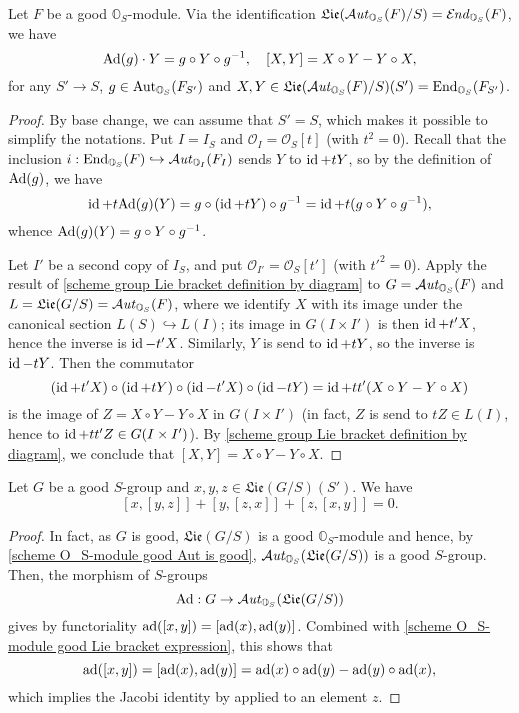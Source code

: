 \begin{proposition}\label{scheme O_S-module good Lie bracket expression}
Let $F$ be a good $\mathbb{O}_S$-module. Via the identification $\mathfrak{Lie}(\operatorname{\mathcal{A}\hspace*{-0.2pt}\textit{ut}\hspace{0.5pt}}_{\mathbb{O}_S}(F)/S)=\operatorname{\mathcal{E}\hspace*{-1pt}\textit{nd}\hspace{0.5pt}}_{\mathbb{O}_S}(F)$, we have
\[\mathrm{Ad}(g)\cdot Y=g\circ Y\circ g^{-1},\quad [X,Y]=X\circ Y-Y\circ X,\]
for any $S'\to S$, $g\in\mathrm{Aut}_{\mathbb{O}_S}(F_{S'})$ and $X,Y\in\mathfrak{Lie}(\operatorname{\mathcal{A}\hspace*{-0.2pt}\textit{ut}\hspace{0.5pt}}_{\mathbb{O}_S}(F)/S)(S')=\mathrm{End}_{\mathbb{O}_S}(F_{S'})$.
\end{proposition}
\begin{proof}
By base change, we can assume that $S'=S$, which makes it possible to simplify the notations. Put $I=I_S$ and $\mathscr{O}_I=\mathscr{O}_S[t]$ (with $t^2=0$). Recall that the inclusion $i:\mathrm{End}_{\mathbb{O}_S}(F)\hookrightarrow\operatorname{\mathcal{A}\hspace*{-0.2pt}\textit{ut}\hspace{0.5pt}}_{\mathbb{O}_I}(F_I)$ sends $Y$ to $\operatorname{id}+tY$, so by the definition of $\mathrm{Ad}(g)$, we have
\[\operatorname{id}+t\mathrm{Ad}(g)(Y)=g\circ(\operatorname{id}+tY)\circ g^{-1}=\operatorname{id}+t(g\circ Y\circ g^{-1}),\]
whence $\mathrm{Ad}(g)(Y)=g\circ Y\circ g^{-1}$.\par
Let $I'$ be a second copy of $I_S$, and put $\mathscr{O}_{I'}=\mathscr{O}_S[t']$ (with $t'^2=0$). Apply the result of \cref{scheme group Lie bracket definition by diagram} to $G=\operatorname{\mathcal{A}\hspace*{-0.2pt}\textit{ut}\hspace{0.5pt}}_{\mathbb{O}_S}(F)$ and $L=\mathfrak{Lie}(G/S)=\operatorname{\mathcal{A}\hspace*{-0.2pt}\textit{ut}\hspace{0.5pt}}_{\mathbb{O}_S}(F)$, where we identify $X$ with its image under the canonical section $L(S)\hookrightarrow L(I)$; its image in $G(I\times I')$ is then $\operatorname{id}+t'X$, hence the inverse is $\operatorname{id}-t'X$. Similarly, $Y$ is send to $\operatorname{id}+tY$, so the inverse is $\operatorname{id}-tY$. Then the commutator
\[(\operatorname{id}+t'X)\circ(\operatorname{id}+tY)\circ(\operatorname{id}-t'X)\circ(\operatorname{id}-tY)=\operatorname{id}+tt'(X\circ Y-Y\circ X)\]
is the image of $Z=X\circ Y-Y\circ X$ in $G(I\times I')$ (in fact, $Z$ is send to $tZ\in L(I)$, hence to $\operatorname{id}+tt'Z\in G(I\times I')$). By \cref{scheme group Lie bracket definition by diagram}, we conclude that $[X,Y]=X\circ Y-Y\circ X$.
\end{proof}

\begin{corollary}\label{scheme O_S-module good Jacobi identity}
Let $G$ be a good $S$-group and $x,y,z\in\mathfrak{Lie}(G/S)(S')$. We have
\[[x,[y,z]]+[y,[z,x]]+[z,[x,y]]=0.\]
\end{corollary}
\begin{proof}
In fact, as $G$ is good, $\mathfrak{Lie}(G/S)$ is a good $\mathbb{O}_S$-module and hence, by \cref{scheme O_S-module good Aut is good}, $\operatorname{\mathcal{A}\hspace*{-0.2pt}\textit{ut}\hspace{0.5pt}}_{\mathbb{O}_S}(\mathfrak{Lie}(G/S))$ is a good $S$-group. Then, the morphism of $S$-groups
\[\mathrm{Ad}:G\to\operatorname{\mathcal{A}\hspace*{-0.2pt}\textit{ut}\hspace{0.5pt}}_{\mathbb{O}_S}(\mathfrak{Lie}(G/S))\]
gives by functoriality $\mathrm{ad}([x,y])=[\mathrm{ad}(x),\mathrm{ad}(y)]$. Combined with \cref{scheme O_S-module good Lie bracket expression}, this shows that
\[\mathrm{ad}([x,y])=[\mathrm{ad}(x),\mathrm{ad}(y)]=\mathrm{ad}(x)\circ\mathrm{ad}(y)-\mathrm{ad}(y)\circ\mathrm{ad}(x),\]
which implies the Jacobi identity by applied to an element $z$.
\end{proof}

